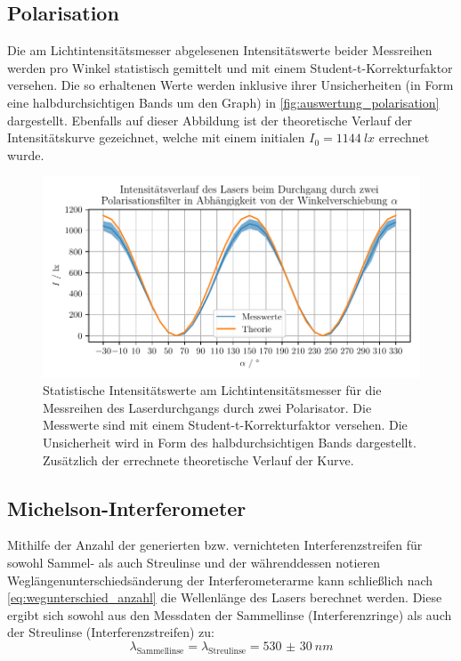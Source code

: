 \documentclass[ngerman]{scrartcl}
\begin{document}
\subsection{Polarisation}
\label{subsec:auswertung_polarisation}

Die am Lichtintensitätsmesser abgelesenen Intensitätswerte beider Messreihen werden pro Winkel statistisch gemittelt und mit einem Student-t-Korrekturfaktor versehen. Die so erhaltenen Werte werden inklusive ihrer Unsicherheiten (in Form eine halbdurchsichtigen Bands um den Graph) in \autoref{fig:auswertung_polarisation} dargestellt. Ebenfalls auf dieser Abbildung ist der theoretische Verlauf der Intensitätskurve gezeichnet, welche mit einem initialen $I_0 = \SI{1144}{lx}$ errechnet wurde.
%
\begin{figure}[H]
    \centering
    \begin{samepage}
        \includegraphics[width=\linewidth]{../python/plots/polarisation.pdf}
        \caption[Messkurve Polarisation]{Statistische Intensitätswerte am Lichtintensitätsmesser für die Messreihen des Laserdurchgangs durch zwei Polarisator. Die Messwerte sind mit einem Student-t-Korrekturfaktor versehen. Die Unsicherheit wird in Form des halbdurchsichtigen Bands dargestellt. Zusätzlich der errechnete theoretische Verlauf der Kurve.}
        \label{fig:auswertung_polarisation}
    \end{samepage}
\end{figure}


\subsection{Michelson-Interferometer}
\label{subsec:auswertung_michelson}

Mithilfe der Anzahl der generierten bzw. vernichteten Interferenzstreifen für sowohl Sammel- als auch Streulinse und der währenddessen notieren Weglängenunterschiedsänderung der Interferometerarme kann schließlich nach \autoref{eq:wegunterschied_anzahl} die Wellenlänge des Lasers berechnet werden. Diese ergibt sich sowohl aus den Messdaten der Sammellinse (Interferenzringe) als auch der Streulinse (Interferenzstreifen) zu:
\[\lambda_{\text{Sammellinse}} = \lambda_{\text{Streulinse}} = \SI{530(30)}{nm}\]
\end{document}
